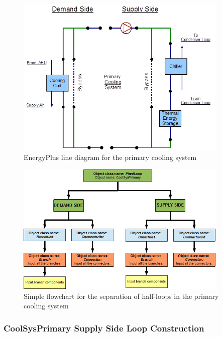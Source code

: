 \begin{figure}[hbtp] %
\centering
\includegraphics[width=0.9\textwidth, height=0.9\textheight, keepaspectratio=true]{media/image047.png}
\caption{EnergyPlus line diagram for the primary cooling system \protect \label{fig:energyplus-line-diagram-for-the-primary-001}}
\end{figure}

\begin{figure}[hbtp] %
\centering
\includegraphics[width=0.9\textwidth, height=0.9\textheight, keepaspectratio=true]{media/image048.png}
\caption{Simple flowchart for the separation of half-loops in the primary cooling system \protect \label{fig:simple-flowchart-for-the-separation-of-half-001}}
\end{figure}

\subsubsection{CoolSysPrimary Supply Side Loop Construction}\label{coolsysprimary-supply-side-loop-construction}

